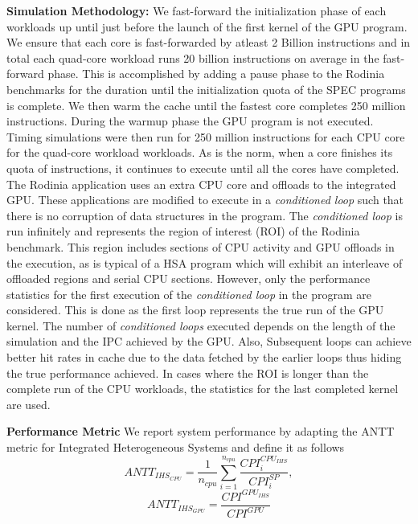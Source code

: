\par \textbf{Simulation Methodology:} We fast-forward the initialization phase of each workloads up until just before the launch of the first kernel of the GPU program. We ensure that each core is fast-forwarded by atleast 2 Billion instructions and in total each quad-core workload runs 20 billion instructions on average in the fast-forward phase. This is accomplished by adding a pause phase to the Rodinia benchmarks for the duration until the initialization quota of the SPEC programs is complete. We then warm the cache until the fastest core completes 250 million instructions. During the warmup phase the GPU program is not executed. Timing simulations were then run for 250 million instructions for each CPU core for the quad-core workload workloads. As is the norm, when a core finishes its quota of instructions, it continues to execute until all the cores have completed. \\
The Rodinia application uses an extra CPU core and offloads to the integrated GPU. These applications are modified to execute in a \textit{conditioned loop} such that there is no corruption of data structures in the program. The \textit{conditioned loop} is run infinitely and represents the region of interest (ROI) of the Rodinia benchmark. This region includes sections of CPU activity and GPU offloads in the execution, as is typical of a HSA program which will exhibit an interleave of offloaded regions and serial CPU sections. However, only the performance statistics for the first execution of the \textit{conditioned loop} in the program are considered. 
This is done as the first loop represents the true run of the GPU kernel. The number of \textit{conditioned loops} executed depends on the length of the simulation and the IPC achieved by the GPU. Also, Subsequent loops can achieve better hit rates in cache due to the data fetched by the earlier loops thus hiding the true performance achieved.
In cases where the ROI is longer than the complete run of the CPU workloads, the statistics for the last completed kernel are used. 
\par \textbf{Performance Metric} We report system performance by adapting the ANTT \cite{antt} metric for Integrated Heterogeneous Systems and define it as follows
{\small
\begin{equation}
ANTT_{IHS_{CPU}} = \frac{1}{n_{cpu}} \sum_{i=1}^{n_{cpu}} \frac{CPI_i^{CPU_{IHS}}}{CPI_i^{SP}},
\end{equation}
\begin{equation}
ANTT_{IHS_{GPU}} = \frac{CPI^{GPU_{IHS}}}{CPI^{GPU}}
\end{equation}
}
